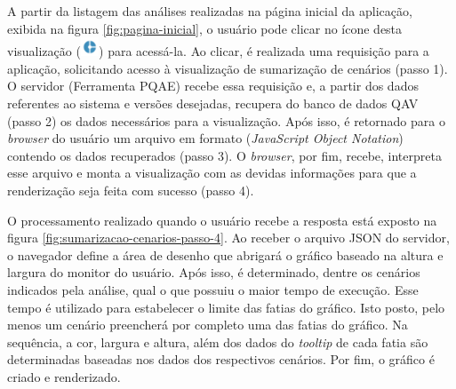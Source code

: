 A partir da listagem das análises realizadas na página inicial da aplicação, exibida na figura \ref{fig:pagina-inicial}, o usuário pode clicar no ícone desta visualização (\includegraphics[height=1.5em,valign=b]{Imagens/visualizacao_1_icone.png}) para acessá-la. Ao clicar, é realizada uma requisição para a aplicação, solicitando acesso à visualização de sumarização de cenários (passo 1). O servidor (Ferramenta PQAE) recebe essa requisição e, a partir dos dados referentes ao sistema e versões desejadas, recupera do banco de dados QAV (passo 2) os dados necessários para a visualização. Após isso, é retornado para o \textit{browser} do usuário um arquivo em formato (\textit{JavaScript Object Notation}) contendo os dados recuperados (passo 3). O \textit{browser}, por fim, recebe, interpreta esse arquivo e monta a visualização com as devidas informações para que a renderização seja feita com sucesso (passo 4).

O processamento realizado quando o usuário recebe a resposta está exposto na figura \ref{fig:sumarizacao-cenarios-passo-4}. Ao receber o arquivo JSON do servidor, o navegador define a área de desenho que abrigará o gráfico baseado na altura e largura do monitor do usuário. Após isso, é determinado, dentre os cenários indicados pela análise, qual o que possuiu o maior tempo de execução. Esse tempo é utilizado para estabelecer o limite das fatias do gráfico. Isto posto, pelo menos um cenário preencherá por completo uma das fatias do gráfico. Na sequência, a cor, largura e altura, além dos dados do \textit{tooltip} de cada fatia são determinadas baseadas nos dados dos respectivos cenários. Por fim, o gráfico é criado e renderizado.


